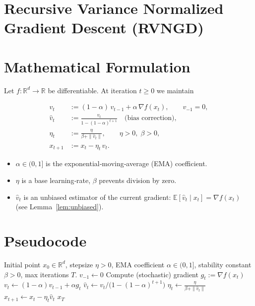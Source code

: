 \documentclass{article}
\begin{document}
\section*{Recursive Variance Normalized Gradient Descent (RVNGD)}

\section*{Mathematical Formulation}
Let $f:\mathbb{R}^d\rightarrow\mathbb{R}$ be differentiable.  
At iteration $t\ge 0$ we maintain

\[
\boxed{
\begin{aligned}
v_t &:= (1-\alpha)\,v_{t-1}+ \alpha\,\nabla f(x_t),\qquad v_{-1}=0,\\[4pt]
\hat v_t &:= \frac{v_t}{1-(1-\alpha)^{t+1}}\quad\text{(bias correction)},\\[4pt]
\eta_t &:= \frac{\eta}{\beta + \|\hat v_t\|},\qquad \eta>0,\;\beta>0,\\[4pt]
x_{t+1} &:= x_t-\eta_t\,\hat v_t .
\end{aligned}}
\]

\begin{itemize}
    \item $\alpha\in(0,1]$ is the exponential‑moving‑average (EMA) coefficient.
    \item $\eta$ is a base learning‑rate, $\beta$ prevents division by zero.
    \item $\hat v_t$ is an unbiased estimator of the current gradient: 
          $\mathbb{E}[\hat v_t\mid x_t]=\nabla f(x_t)$ (see Lemma~\ref{lem:unbiased}).
\end{itemize}

\section*{Pseudocode}
\begin{algorithm}[H]
\caption{Recursive Variance Normalized Gradient Descent (RVNGD)}
\begin{algorithmic}[1]
\Require Initial point $x_0\in\mathbb{R}^d$, stepsize $\eta>0$, EMA coefficient $\alpha\in(0,1]$, 
        stability constant $\beta>0$, max iterations $T$.
\State $v_{-1}\gets 0$ 
    \State Compute (stochastic) gradient $g_t:=\nabla f(x_t)$
    \State $v_t\gets (1-\alpha)v_{t-1}+ \alpha g_t$ 
    \State $\hat v_t\gets v_t\big/\big(1-(1-\alpha)^{t+1}\big)$ 
    \State $\eta_t\gets \displaystyle\frac{\eta}{\beta+\|\hat v_t\|}$
    \State $x_{t+1}\gets x_t-\eta_t\hat v_t$
\EndFor
\State \Return $x_T$
\end{algorithmic}
\end{algorithm}
\end{document}
